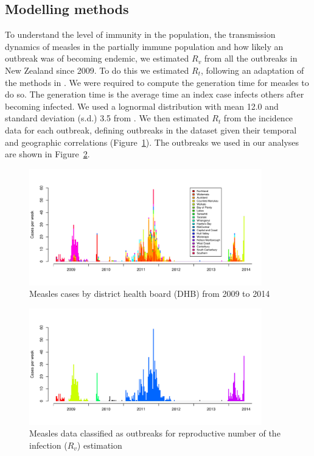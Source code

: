 \documentclass{article}
\begin{document}
\subsection{Modelling methods}

To understand the level of immunity in the population, the transmission dynamics of measles in the partially immune population and how likely an outbreak was of becoming endemic, we estimated $R_v$ from all the outbreaks in New Zealand since 2009. To do this we estimated $R_t$, following an adaptation of the methods in \citep{obidia12,wallinga4}. We were required to compute the generation time for measles to do so. The generation time is the average time an index case infects others after becoming infected. We used a lognormal distribution with mean 12.0 and standard deviation (s.d.) 3.5 from \citep{klinkenberg11}. We then estimated $R_t$ from the incidence data for each outbreak, defining outbreaks in the dataset given their temporal and geographic correlations (Figure~\ref{fig:dhbcases}). The outbreaks we used in our analyses are shown in Figure~\ref{fig:outbreaks}.

\begin{figure}
     \centering
     \includegraphics[width=0.9\textwidth]{cases_by_dhb_2009_2014.pdf}
     \caption{Measles cases by district health board (DHB) from 2009 to 2014}
     \label{fig:dhbcases}
\end{figure}

\begin{figure}
     \centering
     \includegraphics[width=0.9\textwidth]{outbreaks_for_R0.pdf}
     \caption{Measles data classified as outbreaks for reproductive number of the infection ($R_v$) estimation}
     \label{fig:outbreaks}
\end{figure}
\end{document}

